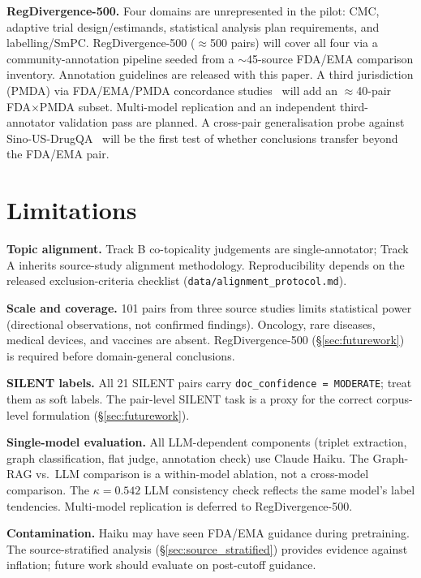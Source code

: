 \documentclass[manuscript]{acmart}
\begin{document}
\textbf{RegDivergence-500.}
Four domains are unrepresented in the pilot: CMC, adaptive trial design/estimands,
statistical analysis plan requirements, and labelling/SmPC. RegDivergence-500
($\approx$500 pairs) will cover all four via a community-annotation pipeline
seeded from a $\sim$45-source FDA/EMA comparison inventory.
Annotation guidelines are released with this paper. A third jurisdiction (PMDA)
via FDA/EMA/PMDA concordance studies~\cite{mita2026doses,gomezfernandez2026inhibitors}
will add an $\approx$40-pair FDA$\times$PMDA subset. Multi-model replication and
an independent third-annotator validation pass are planned.
A cross-pair generalisation probe against Sino-US-DrugQA~\cite{sinousdrugqa2026}
will be the first test of whether conclusions transfer beyond the FDA/EMA pair.

\section{Limitations}
\label{sec:limitations}

\textbf{Topic alignment.} Track B co-topicality judgements are single-annotator;
Track A inherits source-study alignment methodology. Reproducibility depends on
the released exclusion-criteria checklist (\texttt{data/alignment\_protocol.md}).

\textbf{Scale and coverage.} 101 pairs from three source studies limits
statistical power (directional observations, not confirmed findings). Oncology,
rare diseases, medical devices, and vaccines are absent. RegDivergence-500
(\S\ref{sec:futurework}) is required before domain-general conclusions.

\textbf{SILENT labels.} All 21 SILENT pairs carry \texttt{doc\_confidence = MODERATE};
treat them as soft labels. The pair-level SILENT task is a proxy for the correct
corpus-level formulation (\S\ref{sec:futurework}).

\textbf{Single-model evaluation.} All LLM-dependent components (triplet extraction,
graph classification, flat judge, annotation check) use Claude Haiku. The
Graph-RAG vs.\ LLM comparison is a within-model ablation, not a cross-model
comparison. The $\kappa = 0.542$ LLM consistency check reflects the same model's
label tendencies. Multi-model replication is deferred to RegDivergence-500.

\textbf{Contamination.} Haiku may have seen FDA/EMA guidance during pretraining.
The source-stratified analysis (\S\ref{sec:source_stratified}) provides evidence
against inflation; future work should evaluate on post-cutoff guidance.
\end{document}
